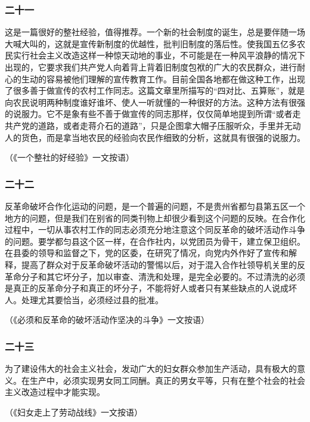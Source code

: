 \documentclass[cn,11pt,chinese]{elegantbook}
\def\myformat#1{\hfil\hfil #1}
\begin{document}
\subsubsection*{\myformat{二十一}}
这是一篇很好的整社经验，值得推荐。一个新的社会制度的诞生，总是要伴随一场大喊大叫的，这就是宣传新制度的优越性，批判旧制度的落后性。使我国五亿多农民实行社会主义改造这样一种惊天动地的事业，不可能是在一种风平浪静的情况下出现的，它要求我们共产党人向着背上背着旧制度包袱的广大的农民群众，进行耐心的生动的容易被他们理解的宣传教育工作。目前全国各地都在做这种工作，出现了很多善于做宣传的农村工作同志。这篇文章里所描写的“四对比、五算账”，就是向农民说明两种制度谁好谁坏、使人一听就懂的一种很好的方法。这种方法有很强的说服力。它不是象有些不善于做宣传的同志那样，仅仅简单地提到所谓“或者走共产党的道路，或者走蒋介石的道路”，只是企图拿大帽子压服听众，手里并无动人的货色，而是拿当地农民的经验向农民作细致的分析，这就具有很强的说服力。\\
\begin{flushright}（《一个整社的好经验》一文按语）\end{flushright}
\subsubsection*{\myformat{二十二}}
反革命破坏合作化运动的问题，是一个普遍的问题，不是贵州省都匀县第五区一个地方的问题，但是我们在别省的同类刊物上却很少看到这个问题的反映。在合作化过程中，一切从事农村工作的同志必须充分地注意这个同反革命的破坏活动作斗争的问题。要学都匀县这个区一样，在合作社内，以党团员为骨干，建立保卫组织。在县委的领导和监督之下，党的区委，在研究了情况，向党内外作好了宣传和解释，提高了群众对于反革命破坏活动的警惕以后，对于混入合作社领导机关里的反革命分子和其它坏分子，加以审查、清洗和处理，是完全必要的。不过清洗的必须是真正的反革命分子和真正的坏分子，不能将好人或者只有某些缺点的人说成坏人。处理尤其要恰当，必须经过县的批准。\\
\begin{flushright}（《必须和反革命的破坏活动作坚决的斗争》一文按语）\end{flushright}
\subsubsection*{\myformat{二十三}}
为了建设伟大的社会主义社会，发动广大的妇女群众参加生产活动，具有极大的意义。在生产中，必须实现男女同工同酬。真正的男女平等，只有在整个社会的社会主义改造过程中才能实现。\\
\begin{flushright}（《妇女走上了劳动战线》一文按语）\end{flushright}
\end{document}
